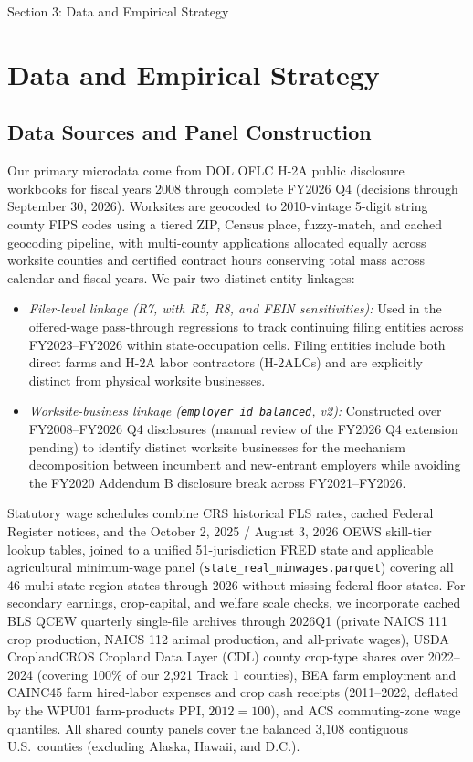 \FloatBarrier
\begin{llmdraft}{Section 3: Data and Empirical Strategy}
\section{Data and Empirical Strategy}
\label{sec:data}

\subsection{Data Sources and Panel Construction}

Our primary microdata come from DOL OFLC H-2A public disclosure workbooks for
fiscal years 2008 through complete FY2026 Q4 (decisions through September 30,
2026). Worksites are geocoded to 2010-vintage 5-digit string county FIPS codes
using a tiered ZIP, Census place, fuzzy-match, and cached geocoding pipeline,
with multi-county applications allocated equally across worksite counties and
certified contract hours conserving total mass across calendar and fiscal
years. We pair two distinct entity linkages:
\begin{itemize}
  \item \emph{Filer-level linkage (R7, with R5, R8, and FEIN
    sensitivities):} Used in the offered-wage pass-through regressions to track
    continuing filing entities across FY2023--FY2026 within state-occupation
    cells. Filing entities include both direct farms and H-2A labor contractors
    (H-2ALCs) and are explicitly distinct from physical worksite businesses.
  \item \emph{Worksite-business linkage (\texttt{employer\_id\_balanced}, v2):}
    Constructed over FY2008--FY2026 Q4 disclosures (manual review of the FY2026
    Q4 extension pending) to identify distinct worksite businesses for the
    mechanism decomposition between incumbent and new-entrant employers while
    avoiding the FY2020 Addendum B disclosure break across FY2021--FY2026.
\end{itemize}

Statutory wage schedules combine CRS historical FLS rates, cached Federal
Register notices, and the October 2, 2025 / August 3, 2026 OEWS skill-tier
lookup tables, joined to a unified 51-jurisdiction FRED state and applicable
agricultural minimum-wage panel (\texttt{state\_real\_minwages.parquet}) covering all
46 multi-state-region states through 2026 without missing federal-floor states.
For secondary earnings, crop-capital, and welfare scale checks, we incorporate
cached BLS QCEW quarterly single-file archives through 2026Q1 (private NAICS
111 crop production, NAICS 112 animal production, and all-private wages),
USDA CroplandCROS Cropland Data Layer (CDL) county crop-type shares over
2022--2024 (covering 100\% of our 2,921 Track 1 counties), BEA farm employment
and CAINC45 farm hired-labor expenses and crop cash receipts (2011--2022,
deflated by the WPU01 farm-products PPI, $2012 = 100$), and ACS commuting-zone
wage quantiles. All shared county panels cover the balanced 3,108 contiguous
U.S.\ counties (excluding Alaska, Hawaii, and D.C.).


\end{llmdraft}
